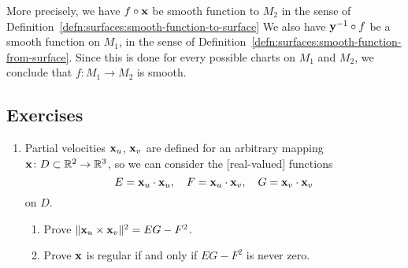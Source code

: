 More precisely, we have $f\circ\mathbf{x}$ be smooth function to $M_{2}$
in the sense of Definition~\ref{defn:surfaces:smooth-function-to-surface}
We also have $\mathbf{y}^{-1}\circ f$ be a smooth function on $M_{1}$, in
the sense of Definition~\ref{defn:surfaces:smooth-function-from-surface}.
Since this is done for every possible charts on $M_{1}$ and $M_{2}$, we
conclude that $f\colon M_{1}\to M_{2}$ is smooth.
\vfill\eject

\subsection*{Exercises}



\begin{enumerate}
\item Partial velocities $\mathbf{x}_{u}$, $\mathbf{x}_{v}$ are defined for
  an arbitrary mapping $\mathbf{x}\colon D\subset\mathbb{R}^{2}\to\mathbb{R}^{3}$, so
  we can consider the [real-valued] functions
  \begin{equation}
E=\mathbf{x}_{u}\cdot\mathbf{x}_{u},\quad
F=\mathbf{x}_{u}\cdot\mathbf{x}_{v},\quad
G=\mathbf{x}_{v}\cdot\mathbf{x}_{v}
  \end{equation}
  on $D$.
\begin{enumerate}
\item Prove $\|\mathbf{x}_{u}\times\mathbf{x}_{v}\|^{2} = EG-F^{2}$.
\item Prove $\mathbf{x}$ is regular if and only if $EG-F^{2}$ is never zero.
\end{enumerate}
\end{enumerate}

